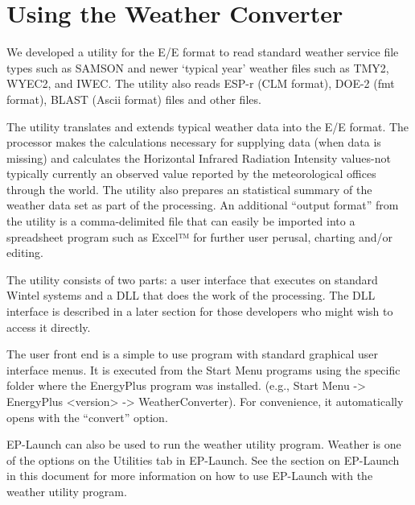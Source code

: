 \section{Using the Weather Converter}\label{using-the-weather-converter}

We developed a utility for the E/E format to read standard weather service file types such as SAMSON and newer `typical year' weather files such as TMY2, WYEC2, and IWEC. The utility also reads ESP-r (CLM format), DOE-2 (fmt format), BLAST (Ascii format) files and other files.

The utility translates and extends typical weather data into the E/E format. The processor makes the calculations necessary for supplying data (when data is missing) and calculates the Horizontal Infrared Radiation Intensity values-not typically currently an observed value reported by the meteorological offices through the world. The utility also prepares an statistical summary of the weather data set as part of the processing. An additional ``output format'' from the utility is a comma-delimited file that can easily be imported into a spreadsheet program such as Excel™ for further user perusal, charting and/or editing.

The utility consists of two parts: a user interface that executes on standard Wintel systems and a DLL that does the work of the processing. The DLL interface is described in a later section for those developers who might wish to access it directly.

The user front end is a simple to use program with standard graphical user interface menus. It is executed from the Start Menu programs using the specific folder where the EnergyPlus program was installed. (e.g., Start Menu -\textgreater{} EnergyPlus \textless{}version\textgreater{} -\textgreater{} WeatherConverter). For convenience, it automatically opens with the ``convert'' option.

EP-Launch can also be used to run the weather utility program. Weather is one of the options on the Utilities tab in EP-Launch. See the section on EP-Launch in this document for more information on how to use EP-Launch with the weather utility program.

